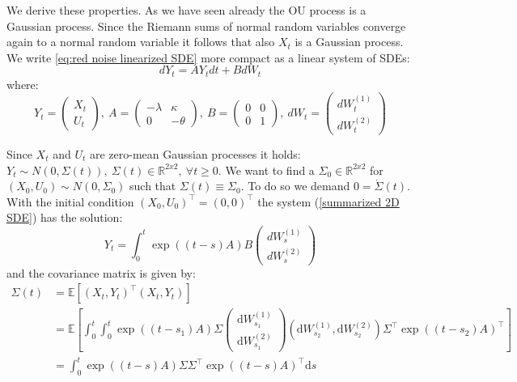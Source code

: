 \documentclass[%
thesis=student,%
coverpage=false,%
titlepage=false,%
headmarks=true, %
english,%
font=libertine, %
math=newpxtx, %
BCOR=5mm,%
coverBCOR=11mm%
]{tumbook}
\begin{document}
We derive these properties. As we have seen already the OU process is a Gaussian process. Since the Riemann sums of normal random variables converge again to a normal random variable it follows that also $X_{t}$ is a Gaussian process. We write \eqref{eq:red noise linearized SDE} more compact as a linear system of SDEs: 
\[
dY_{t} = AY_{t}dt + BdW_{t}
\]
where:
\begin{equation}
        Y_{t} = 
    \begin{pmatrix}
       X_{t} \\
       U_{t}
    \end{pmatrix}
    ,\ A = 
    \begin{pmatrix}
        -\lambda &  \kappa \\
        0        & -\theta
    \end{pmatrix}
    ,\ B = 
    \begin{pmatrix}
        0 & 0 \\
        0 & 1
    \end{pmatrix}
    ,\ dW_{t} = 
    \begin{pmatrix}
        dW_{t}^{(1)} \\
        dW_{t}^{(2)}
    \end{pmatrix}
    \label{summarized 2D SDE}
\end{equation}


Since $X_{t}$ and $U_{t}$ are zero-mean Gaussian processes it holds: $Y_{t} \sim N(0,\Sigma(t)),\ \Sigma(t) \in \mathbb{R}^{2x2}, \ \forall t\geq 0$. We want to find a $\Sigma_{0} \in \mathbb{R}^{2x2}$ for $(X_{0},U_{0}) \sim N(0,\Sigma_{0})$ such that $\Sigma(t) \equiv \Sigma_{0}$. To do so we demand $0 = \dot{\Sigma}(t)$. With the initial condition $(X_{0},U_{0})^\top = (0,0)^\top$ the system (\ref{summarized 2D SDE}) has the solution: 
\[
Y_{t} = \int_{0}^{t}\exp((t-s)A)B\begin{pmatrix} dW_{s}^{(1)} \\ dW_{s}^{(2)} \end{pmatrix}
\]
and the covariance matrix is given by:
\begin{align*}
\Sigma(t)&=\mathbb{E}[\left(X_t,Y_t\right)^\top\left(X_t,Y_t\right)]\\
 &=\mathbb{E}[\int_0^t\int_0^t\exp((t-s_1)A)\Sigma\begin{pmatrix}\mathrm{d} W_{s_1}^{(1)}\\\mathrm{d} W_{s_1}^{(2)}\end{pmatrix}\left(\mathrm{d} W_{s_2}^{(1)},\mathrm{d} W_{s_2}^{(2)}\right)\Sigma^\top\exp((t-s_2)A)^\top]\\
 &=\int_0^t\exp((t-s)A)\Sigma\Sigma^\top\exp((t-s)A)^\top \mathrm{d} s
\end{align*}
\end{document}
